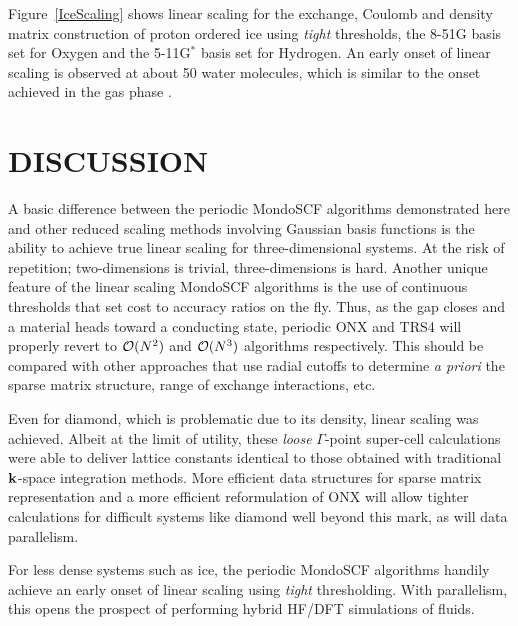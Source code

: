 \documentclass[prb,aps,nobibnotes,twocolumn,doublespace,twocolumngrid,superbib]{revtex4}
\begin{document}
Figure~\ref{IceScaling} shows linear scaling for the exchange, Coulomb and density matrix
construction of proton ordered ice \cite{} using {\it tight} thresholds, the 8-51G basis set
for Oxygen and the 5-11G$^*$ basis set for Hydrogen.  An early onset of linear scaling 
is observed at about 50 water molecules, which is similar to the onset achieved in the gas 
phase \cite{ANiklasson03}.


\section{DISCUSSION}

A basic difference between the periodic {\sc MondoSCF} algorithms demonstrated 
here and other reduced scaling methods involving Gaussian basis functions is the 
ability to achieve true linear scaling for three-dimensional systems.  At the risk
of repetition; two-dimensions is trivial, three-dimensions is hard.  Another unique
feature of the linear scaling {\sc MondoSCF} algorithms is the use of continuous
thresholds that set cost to accuracy ratios on the fly.  Thus, as the gap closes and
a material heads toward a conducting state, periodic {\sc ONX} and {\sc TRS4} will
properly revert to ${\cal O}(N^2)$ and ${\cal O}(N^3)$ algorithms respectively.  This
should be compared with other approaches that use radial cutoffs to determine {\em a priori} 
the sparse matrix structure, range of exchange interactions, etc. 

Even for diamond, which is problematic due to its density, linear scaling was achieved.  
Albeit at the limit of utility, these {\it loose} $\Gamma$-point super-cell calculations were 
able to deliver lattice constants identical to those obtained with traditional 
${\bf k}$-space integration methods.  More efficient data structures for sparse 
matrix representation and a more efficient reformulation of {\sc ONX} will allow 
tighter calculations for difficult systems like diamond well beyond this mark, 
as will data parallelism.  

For less dense systems such as ice, the periodic {\sc MondoSCF} algorithms handily 
achieve an early onset of linear scaling using {\it tight} thresholding.  With parallelism,
this opens the prospect of performing hybrid HF/DFT simulations of fluids. 
\end{document}
